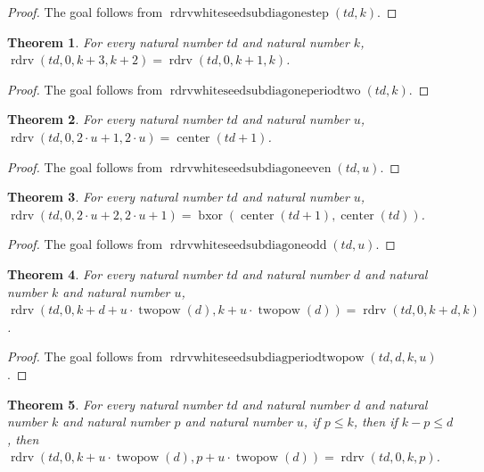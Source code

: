 \documentclass[11pt]{article}
\newtheorem{theorem}{Theorem}[section]
\theoremstyle{definition}
\begin{document}
\begin{proof}
The goal follows from \(\operatorname{rdrvwhiteseedsubdiagonestep}(td, k)\).
\end{proof}
\begin{theorem}
\label{ll:paper:rdrv-white-seed-subdiag-one-period-two}
For every natural number \(td\) and natural number \(k\), \(\operatorname{rdrv}(td, 0, k + 3, k + 2) = \operatorname{rdrv}(td, 0, k + 1, k)\).
\end{theorem}
\begin{proof}
The goal follows from \(\operatorname{rdrvwhiteseedsubdiagoneperiodtwo}(td, k)\).
\end{proof}
\begin{theorem}
\label{ll:paper:rdrv-white-seed-subdiag-one-even}
For every natural number \(td\) and natural number \(u\), \(\operatorname{rdrv}(td, 0, 2 \cdot u + 1, 2 \cdot u) = \operatorname{center}(td + 1)\).
\end{theorem}
\begin{proof}
The goal follows from \(\operatorname{rdrvwhiteseedsubdiagoneeven}(td, u)\).
\end{proof}
\begin{theorem}
\label{ll:paper:rdrv-white-seed-subdiag-one-odd}
For every natural number \(td\) and natural number \(u\), \(\operatorname{rdrv}(td, 0, 2 \cdot u + 2, 2 \cdot u + 1) = \operatorname{bxor}(\operatorname{center}(td + 1), \operatorname{center}(td))\).
\end{theorem}
\begin{proof}
The goal follows from \(\operatorname{rdrvwhiteseedsubdiagoneodd}(td, u)\).
\end{proof}
\begin{theorem}
\label{ll:paper:rdrv-white-seed-subdiag-period-twopow}
For every natural number \(td\) and natural number \(d\) and natural number \(k\) and natural number \(u\), \(\operatorname{rdrv}(td, 0, k + d + u \cdot \operatorname{twopow}(d), k + u \cdot \operatorname{twopow}(d)) = \operatorname{rdrv}(td, 0, k + d, k)\).
\end{theorem}
\begin{proof}
The goal follows from \(\operatorname{rdrvwhiteseedsubdiagperiodtwopow}(td, d, k, u)\).
\end{proof}
\begin{theorem}
\label{ll:paper:rdrv-white-seed-diag-shift-twopow-eq}
For every natural number \(td\) and natural number \(d\) and natural number \(k\) and natural number \(p\) and natural number \(u\), if \(p \le k\), then if \(k - p \le d\), then \(\operatorname{rdrv}(td, 0, k + u \cdot \operatorname{twopow}(d), p + u \cdot \operatorname{twopow}(d)) = \operatorname{rdrv}(td, 0, k, p)\).
\end{theorem}
\end{document}
